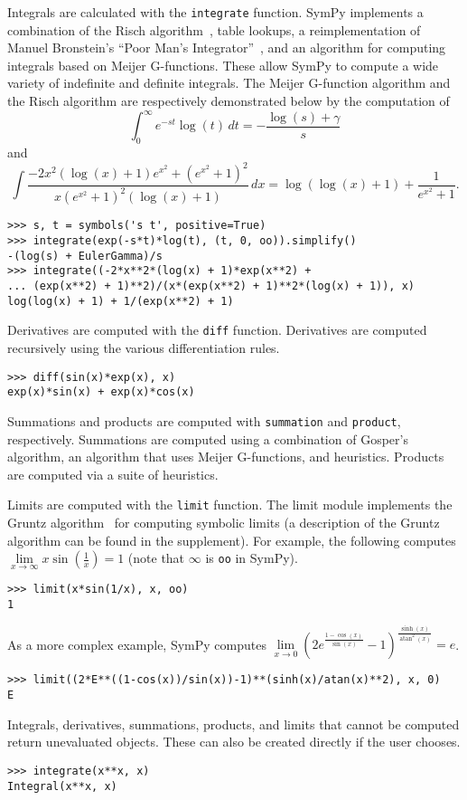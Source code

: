 Integrals are calculated with the \verb|integrate| function. SymPy
implements a combination of the Risch
algorithm~\cite{bronstein2005integration}, table lookups, a reimplementation
of Manuel Bronstein's ``Poor Man's Integrator''~\cite{Bronstein2005pmint}, and
an algorithm for computing integrals based on Meijer G-functions. These allow
SymPy to compute a wide variety of indefinite and definite integrals. The
Meijer G-function algorithm and the Risch algorithm are respectively
demonstrated below by the computation of $$\int_{0}^{\infty} e^{-s t}\log{\left
      (t \right )}\, dt = - \frac{ \log{\left (s \right
    )} + \gamma}{s}$$ and $$\int \frac{- 2 x^{2}
  \left(\log{\left (x \right )} + 1\right) e^{x^{2}} + \left(e^{x^{2}} +
    1\right)^{2}}{x \left(e^{x^{2}} + 1\right)^{2} \left(\log{\left (x \right
      )} + 1\right)}\, dx = \log{\left (\log{\left (x \right )} + 1 \right )}
+ \frac{1}{e^{x^{2}} + 1}.$$
\begin{verbatim}
>>> s, t = symbols('s t', positive=True)
>>> integrate(exp(-s*t)*log(t), (t, 0, oo)).simplify()
-(log(s) + EulerGamma)/s
>>> integrate((-2*x**2*(log(x) + 1)*exp(x**2) +
... (exp(x**2) + 1)**2)/(x*(exp(x**2) + 1)**2*(log(x) + 1)), x)
log(log(x) + 1) + 1/(exp(x**2) + 1)
\end{verbatim}

Derivatives are computed with the \verb|diff| function. Derivatives are
computed recursively using the various differentiation rules.
\begin{verbatim}
>>> diff(sin(x)*exp(x), x)
exp(x)*sin(x) + exp(x)*cos(x)
\end{verbatim}

Summations and products are computed with \verb|summation| and \verb|product|,
respectively. Summations are computed using a combination of Gosper's
algorithm, an algorithm that uses Meijer G-functions, and heuristics. Products
are computed via a suite of heuristics.

Limits are computed with the \verb|limit| function. The limit module
implements the Gruntz algorithm~\cite{Gruntz1996limits} for computing symbolic
limits (a description of the Gruntz algorithm can be found in the supplement).
For example, the following computes
$\lim\limits_{x\to \infty} x\sin(\frac{1}{x})=1$ (note that $\infty$ is
\verb|oo| in SymPy).
\begin{verbatim}
>>> limit(x*sin(1/x), x, oo)
1
\end{verbatim}
As a more complex example, SymPy computes $\lim\limits_{x\to 0}{\left(2 e^{\frac{1 - \cos{\left (x \right )}}{\sin{\left (x \right )}}} -
  1\right)}^{\frac{\sinh{\left (x \right )}}{\operatorname{atan}^{2}{\left (x
      \right )}}} = e$.
\begin{verbatim}
>>> limit((2*E**((1-cos(x))/sin(x))-1)**(sinh(x)/atan(x)**2), x, 0)
E
\end{verbatim}

Integrals, derivatives, summations, products, and limits that cannot be
computed return unevaluated objects. These can also be created directly if the
user chooses.
\begin{verbatim}
>>> integrate(x**x, x)
Integral(x**x, x)
\end{verbatim}

